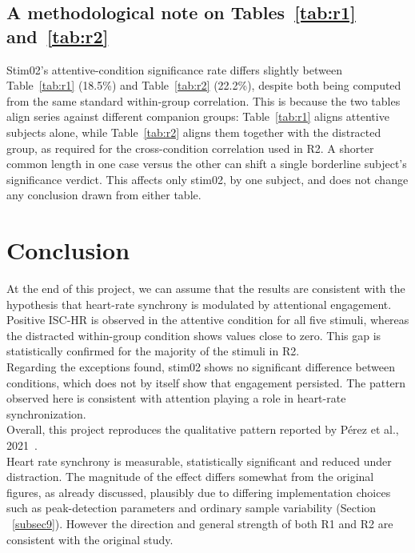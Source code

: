 \documentclass[pdflatex,sn-mathphys-num]{sn-jnl}%
\theoremstyle{thmstyleone}%
\theoremstyle{thmstyletwo}%
\theoremstyle{thmstylethree}%
\begin{document}
\subsection{A methodological note on Tables~\ref{tab:r1} and~\ref{tab:r2}}

Stim02's attentive-condition significance rate differs slightly between Table~\ref{tab:r1} (18.5\%) and Table~\ref{tab:r2} (22.2\%), despite both being computed from the same standard within-group correlation. This is because the two tables align series against different companion groups: Table~\ref{tab:r1} aligns attentive subjects alone, while Table~\ref{tab:r2} aligns them together with the distracted group, as required for the cross-condition correlation used in R2. A shorter common length in one case versus the other can shift a single borderline subject's significance verdict. This affects only stim02, by one subject, and does not change any conclusion drawn from either table.



\section{Conclusion}\label{sec7}

At the end of this project, we can assume that the results are consistent with the hypothesis that heart-rate synchrony is modulated by attentional engagement.\\
Positive ISC-HR is observed in the attentive condition for all five stimuli, whereas the distracted within-group condition shows values close to zero. This gap is statistically confirmed for the majority of the stimuli in R2.\\
Regarding the exceptions found, stim02 shows no significant difference between conditions, which does not by itself show that engagement persisted.
The pattern observed here is consistent with attention playing a role in heart-rate synchronization.\\
Overall, this project reproduces the qualitative pattern reported by Pérez et al., 2021~\cite{perez2021}.\\
Heart rate synchrony is measurable, statistically significant and reduced under distraction. The magnitude of the effect differs somewhat from the original figures, as already discussed, plausibly due to differing implementation choices such as peak-detection parameters and ordinary sample variability (Section ~\ref{subsec9}). However the direction and general strength of both R1 and R2 are consistent with the original study.
\end{document}
